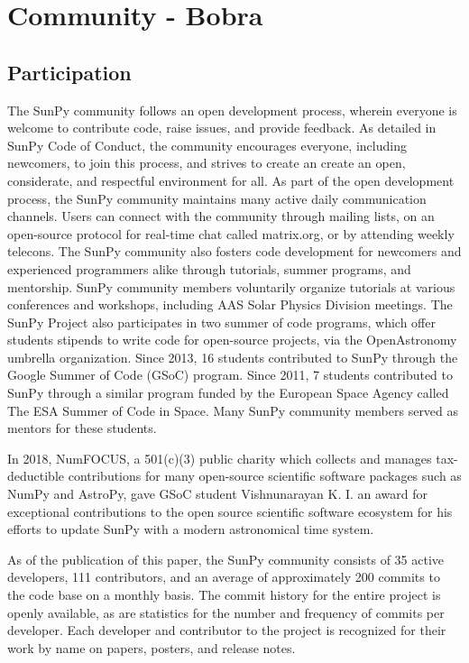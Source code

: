 \section{Community - Bobra}
\label{sec:community}


\subsection{Participation}
The SunPy community follows an open development process, wherein everyone is welcome to contribute code, raise issues, and provide feedback. 
As detailed in SunPy Code of Conduct, the community encourages everyone, including newcomers, to join this process, and strives to create an create an open, considerate, and respectful environment for all. 
As part of the open development process, the SunPy community maintains many active daily communication channels. 
Users can connect with the community through mailing lists, on an open-source protocol for real-time chat called matrix.org, or by attending weekly telecons.
The SunPy community also fosters code development for newcomers and experienced programmers alike through tutorials, summer programs, and mentorship. 
SunPy community members voluntarily organize tutorials at various conferences and workshops, including AAS Solar Physics Division meetings. 
The SunPy Project also participates in two summer of code programs, which offer students stipends to write code for open-source projects, via the OpenAstronomy umbrella organization. 
Since 2013, 16 students contributed to SunPy through the Google Summer of Code (GSoC) program. 
Since 2011, 7 students contributed to SunPy through a similar program funded by the European Space Agency called The ESA Summer of Code in Space. 
Many SunPy community members served as mentors for these students. 

In 2018, NumFOCUS, a 501(c)(3) public charity which collects and manages tax-deductible contributions for many open-source scientific software packages such as NumPy and AstroPy, gave GSoC student Vishnunarayan K. I. an award for exceptional contributions to the open source scientific software ecosystem for his efforts to update SunPy with a modern astronomical time system.

As of the publication of this paper, the SunPy community consists of 35 active developers, 111 contributors, and an average of approximately 200 commits to the code base on a monthly basis. 
The commit history for the entire project is openly available, as are statistics for the number and frequency of commits per developer. 
Each developer and contributor to the \sunpy project is recognized for their work by name on papers, posters, and release notes.